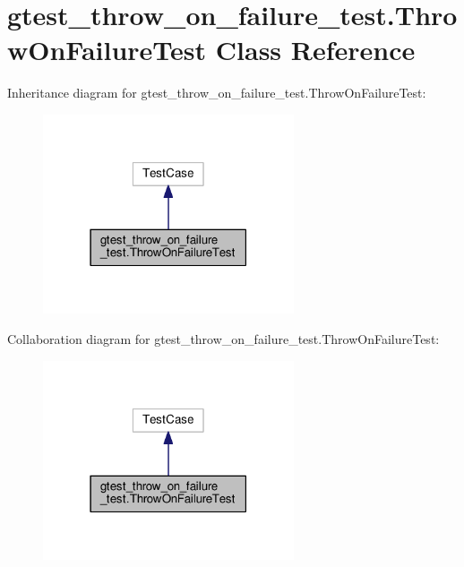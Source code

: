 \hypertarget{classgtest__throw__on__failure__test_1_1ThrowOnFailureTest}{}\section{gtest\+\_\+throw\+\_\+on\+\_\+failure\+\_\+test.\+Throw\+On\+Failure\+Test Class Reference}
\label{classgtest__throw__on__failure__test_1_1ThrowOnFailureTest}


Inheritance diagram for gtest\+\_\+throw\+\_\+on\+\_\+failure\+\_\+test.\+Throw\+On\+Failure\+Test\+:\nopagebreak
\begin{figure}[H]
\begin{center}
\leavevmode
\includegraphics[width=210pt]{classgtest__throw__on__failure__test_1_1ThrowOnFailureTest__inherit__graph}
\end{center}
\end{figure}


Collaboration diagram for gtest\+\_\+throw\+\_\+on\+\_\+failure\+\_\+test.\+Throw\+On\+Failure\+Test\+:\nopagebreak
\begin{figure}[H]
\begin{center}
\leavevmode
\includegraphics[width=210pt]{classgtest__throw__on__failure__test_1_1ThrowOnFailureTest__coll__graph}
\end{center}
\end{figure}
